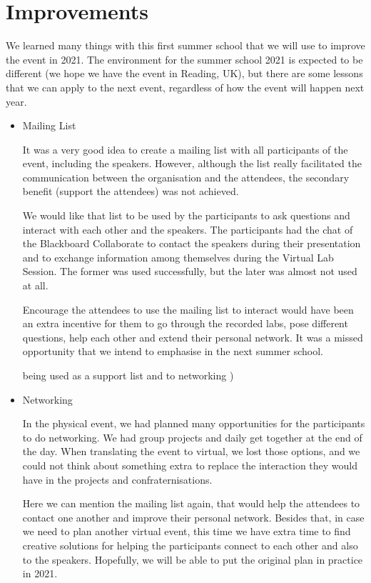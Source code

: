 \section{Improvements}

We learned many things with this first summer school that we will use to improve the event in 2021. The environment for the summer school 2021 is expected to be different (we hope we have the event in Reading, UK), but there are some lessons that we can apply to the next event, regardless of how the event will happen next year.

\begin{itemize}

\item Mailing List

It was a very good idea to create a mailing list with all participants of the event, including the speakers. However, although the list really facilitated the communication between the organisation and the attendees, the secondary benefit (support the attendees) was not achieved.

We would like that list to be used by the participants to ask questions and interact with each other and the speakers. The participants had the chat of the Blackboard Collaborate to contact the speakers during their presentation and to exchange information among themselves during the Virtual Lab Session. The former was used successfully, but the later was almost not used at all.

Encourage the attendees to use the mailing list to interact would have been an extra incentive for them to go through the recorded labs, pose different questions, help each other and extend their personal network. It was a missed opportunity that we intend to emphasise in the next summer school.

being used as a support list and to networking )

\item Networking

In the physical event, we had planned many opportunities for the participants to do networking. We had group projects and daily get together at the end of the day. When translating the event to virtual, we lost those options, and we could not think about something extra to replace the interaction they would have in the projects and confraternisations.

Here we can mention the mailing list again, that would help the attendees to contact one another and improve their personal network. Besides that, in case we need to plan another virtual event, this time we have extra time to find creative solutions for helping the participants connect to each other and also to the speakers. Hopefully, we will be able to put the original plan in practice in 2021.


\end{itemize}
